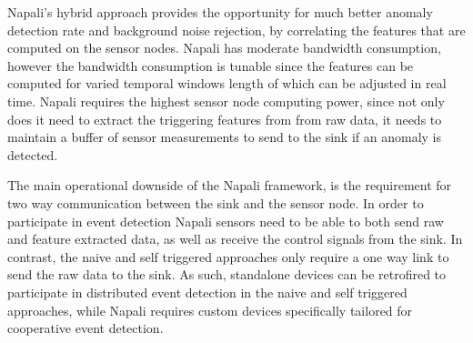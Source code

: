 Napali's hybrid approach provides the opportunity for much better anomaly detection rate and background noise rejection, by correlating the features that are computed on the sensor nodes.
Napali has moderate bandwidth consumption, however the bandwidth consumption is tunable since the features can be computed for varied temporal windows length of which can be adjusted in real time.
Napali requires the highest sensor node computing power, since not only does it need to extract the triggering features from from raw data, it needs to maintain a buffer of sensor measurements to send to the sink if an anomaly is detected.

The main operational downside of the Napali framework, is the requirement for two way communication between the sink and the sensor node.
In order to participate in event detection Napali sensors need to be able to both send raw and feature extracted data, as well as receive the control signals from the sink.
In contrast, the naive and self triggered approaches only require a one way link to send the raw data to the sink.
As such, standalone devices can be retrofired to participate in distributed event detection in the naive and self triggered approaches, while Napali requires custom devices specifically tailored for cooperative event detection.


